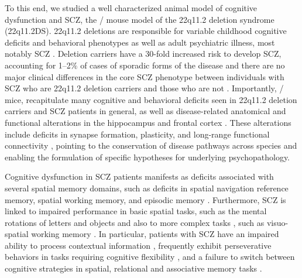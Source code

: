 To this end, we studied a well characterized animal model of cognitive dysfunction and SCZ, the \df/ mouse model of the 22q11.2 deletion syndrome (22q11.2DS). 22q11.2 deletions are responsible for variable childhood cognitive deficits and behavioral phenotypes as well as adult psychiatric illness, most notably SCZ \citep{Biswas2016, Schneider2014}. Deletion carriers have a 30-fold increased risk to develop SCZ, accounting for 1–2$\%$ of cases of sporadic forms of the disease \citep{Karayiorgou2010, Xu2008} and there are no major clinical differences in the core SCZ phenotype between individuals with SCZ who are 22q11.2 deletion carriers and those who are not \citep{Bassett2003}\citep{Bassett1998}. Importantly, \df/ mice, recapitulate many cognitive and behavioral deficits seen in 22q11.2 deletion carriers and SCZ patients in general, as well as disease-related anatomical and functional alterations in the hippocampus and frontal cortex \citep{Glausier2013}\citep{Scariati2016}\citep{Schmitt2015}\citep{Schmitt2016}\citep{Spencer2004}\citep{Uhlhaas2010}\citep{Weinberger2016}. These alterations include deficits in synapse formation, plasticity, and long-range functional connectivity \citep{Drew2011b}\citep{Mukai2008}\citep{Stark2008}\citep{Fenelon2013}\citep{Mukai2015}\citep{Sigurdsson2010}\citep{Tamura2016}, pointing to the conservation of disease pathways across species and enabling the formulation of specific hypotheses for underlying psychopathology.

Cognitive dysfunction in SCZ patients manifests as deficits associated with several spatial memory domains, such as deficits in spatial navigation reference memory, spatial working memory, and episodic memory \citep{Hanlon2006}\citep{Piskulic2007}\citep{Ranganath2008}\citep{Schaefer2013}\citep{Wilkins2013}. Furthermore, SCZ is linked to impaired performance in basic spatial tasks, such as the mental rotations of letters and objects \citep{DeVignemont2006} and also to more complex tasks \citep{Landgraf2011}\citep{Weniger2008}, such as visuo-spatial working memory \citep[see review][]{Piskulic2007}. In particular, patients with SCZ have an impaired ability to process contextual information \citep{Barch2003}\citep{Cohen1999}\citep{Maren2013}, frequently exhibit perseverative behaviors in tasks requiring cognitive flexibility \citep{Crider1997}\citep{Leeson2009}\citep{Morice1990}, and a failure to switch between cognitive strategies in spatial, relational and associative memory tasks \citep{Armstrong2012}\citep{Hanlon2006}\citep{Sheffield2012}\citep{Wilkins2013}.

